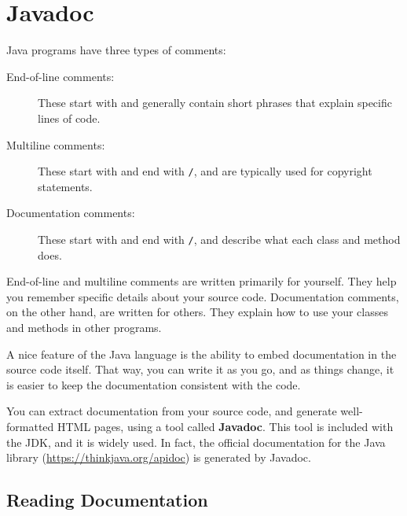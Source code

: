 \chapter{Javadoc}
\label{javadoc}
\label{javadoc}


Java programs have three types of comments:

\begin{description}

\item[End-of-line comments:]
These start with \java{//} and generally contain short phrases that explain specific lines of code.


\item[Multiline comments:]
These start with \java{/*} and end with \textcolor{comment}{\tt */}, and are typically used for copyright statements.

\item[Documentation comments:]
These start with \java{/**} and end with \textcolor{comment}{\tt */}, and describe what each class and method does.

\end{description}

End-of-line and multiline comments are written primarily for yourself.
They help you remember specific details about your source code.
Documentation comments, on the other hand, are written for others.
They explain how to use your classes and methods in other programs.


A nice feature of the Java language is the ability to embed documentation in the source code itself.
That way, you can write it as you go, and as things change, it is easier to keep the documentation consistent with the code.


You can extract documentation from your source code, and generate well-formatted HTML pages, using a tool called {\bf Javadoc}.
This tool is included with the JDK, and it is widely used.
In fact, the official documentation for the Java library (\url{https://thinkjava.org/apidoc}) is generated by Javadoc.


\section{Reading Documentation}
\label{javadoc_reading-documentation}

